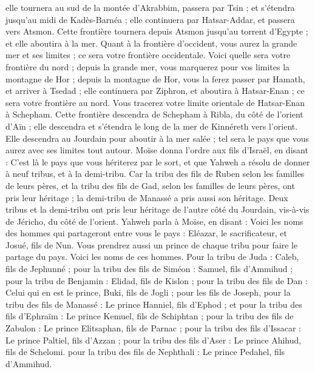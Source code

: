 \begin{multicols}{2}
elle tournera au sud de la montée d’Akrabbim, passera par Tsin ; et s’étendra jusqu’au midi de Kadès-Barnéa ; elle continuera par Hatsar-Addar, et passera vers Atsmon.
Cette frontière tournera depuis Atsmon jusqu'au torrent d'Egypte ; et elle aboutira à la mer.
Quant à la frontière d'occident, vous aurez la grande mer et ses limites ; ce sera votre frontière occidentale.
Voici quelle sera votre frontière du nord ; depuis la grande mer, vous marquerez pour vos limites la montagne de Hor ;
depuis la montagne de Hor, vous la ferez passer par Hamath, et arriver à Tsedad ;
elle continuera par Ziphron, et aboutira à Hatsar-Enan ; ce sera votre frontière au nord.
Vous tracerez votre limite orientale de Hatsar-Enan à Schepham.
Cette frontière descendra de Schepham à Ribla, du côté de l'orient d’Aïn ; elle descendra et s'étendra le long de la mer de Kinnéreth vers l'orient.
Elle descendra au Jourdain pour aboutir à la mer salée ; tel sera le pays que vous aurez avec ses limites tout autour.
Moïse donna l’ordre aux fils d'Israël, en disant : C'est là le pays que vous hériterez par le sort, et que Yahweh a résolu de donner à neuf tribus, et à la demi-tribu.
Car la tribu des fils de Ruben selon les familles de leurs pères, et la tribu des fils de Gad, selon les familles de leurs pères, ont pris leur héritage ; la demi-tribu de Manassé a pris aussi son héritage.
Deux tribus et la demi-tribu ont pris leur héritage de l’autre côté du Jourdain, vis-à-vis de Jéricho, du côté de l’orient.
Yahweh parla à Moïse, en disant :
Voici les noms des hommes qui partageront entre vous le pays : Eléazar, le sacrificateur, et Josué, fils de Nun.
Vous prendrez aussi un prince de chaque tribu pour faire le partage du pays.
Voici les noms de ces hommes. Pour la tribu de Juda : Caleb, fils de Jephunné ;
pour la tribu des fils de Siméon : Samuel, fils d’Ammihud ;
pour la tribu de Benjamin : Elidad, fils de Kislon ;
pour la tribu des fils de Dan : Celui qui en est le prince, Buki, fils de Jogli ;
pour les fils de Joseph, pour la tribu des fils de Manassé : Le prince Hanniel, fils d'Ephod ;
et pour la tribu des fils d'Ephraïm : Le prince Kemuel, fils de Schiphtan ;
pour la tribu des fils de Zabulon : Le prince Elitsaphan, fils de Parnac ;
pour la tribu des fils d'Issacar : Le prince Paltiel, fils d’Azzan ;
pour la tribu des fils d'Aser : Le prince Ahihud, fils de Schelomi.
pour la tribu des fils de Nephthali : Le prince Pedahel, fils d’Ammihud.

\end{multicols}
